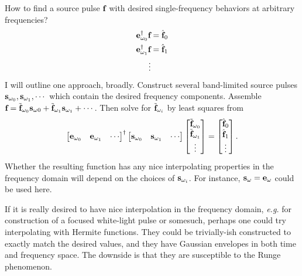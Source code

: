 How to find a source pulse $\textbf{f}$ with desired single-frequency behaviors at arbitrary frequencies?
%
\begin{equation}
\begin{aligned}
	\textbf{e}_{\omega_0}^\dagger \textbf{f} &= \hat{\textbf{f}}_0 \\ 
	\textbf{e}_{\omega_1}^\dagger \textbf{f} &= \hat{\textbf{f}}_1 \\ 
	\vdots
\end{aligned}
\end{equation}
%
I will outline one approach, broadly.  Construct several band-limited source pulses $\textbf{s}_{\omega_0}, \textbf{s}_{\omega_1}, \cdots$ which contain the desired frequency components.  Assemble $\textbf{f} = \tilde{\textbf{f}}_{\omega_0} \textbf{s}_{\omega 0} + \tilde{\textbf{f}}_{\omega_1} \textbf{s}_{\omega_1} + \cdots$.  Then solve for $\tilde{\textbf{f}}_{\omega_i}$ by least squares from
%
\begin{equation}
    \begin{bmatrix}
	    \textbf{e}_{\omega_0} & \textbf{e}_{\omega_1} & \cdots
    \end{bmatrix}^\dagger
    \begin{bmatrix}
	    \textbf{s}_{\omega_0} & \textbf{s}_{\omega_1} & \cdots
    \end{bmatrix}
    \begin{bmatrix}
        \tilde{\textbf{f}}_{\omega_0} \\
        \tilde{\textbf{f}}_{\omega_1} \\
        \vdots
    \end{bmatrix}
    =
    \begin{bmatrix}
        \hat{\textbf{f}}_0 \\
        \hat{\textbf{f}}_1 \\
        \vdots
    \end{bmatrix}.
\end{equation}
%
Whether the resulting function has any nice interpolating properties in the frequency domain will depend on the choices of $\textbf{s}_{\omega_i}$.  For instance, $\textbf{s}_{\omega} = \textbf{e}_\omega$ could be used here.

If it is really desired to have nice interpolation in the frequency domain, \emph{e.g.} for construction of a focused white-light pulse or somesuch, perhaps one could try interpolating with Hermite functions.  They could be trivially-ish constructed to exactly match the desired values, and they have Gaussian envelopes in both time and frequency space.  The downside is that they are susceptible to the Runge phenomenon.

